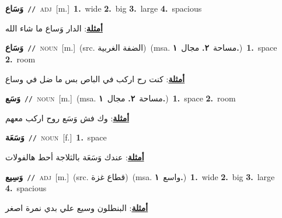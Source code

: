 \documentclass[10pt,a4paper,twoside]{article} %
\begin{document}
\begin{multicols}{2}
{\setlength\topsep{0pt}\textbf{\foreignlanguage{arabic}{وَسَاع}}\ {\color{gray}\texttt{//}\color{black}}\ \textsc{adj}\ [m.]\ \textbf{1.}~wide  \textbf{2.}~big  \textbf{3.}~large  \textbf{4.}~spacious\  \begin{flushright}\color{gray}\foreignlanguage{arabic}{\textbf{\underline{\foreignlanguage{arabic}{أمثلة}}}: الدار وَساع ما شاء الله}\end{flushright}\color{black}} \vspace{2mm}

{\setlength\topsep{0pt}\textbf{\foreignlanguage{arabic}{وَسَاع}}\ {\color{gray}\texttt{//}\color{black}}\ \textsc{noun}\ [m.]\ (src. \color{gray}\foreignlanguage{arabic}{الضفة الغربية}\color{black})\ \color{gray}(msa. \foreignlanguage{arabic}{مساحة}~\foreignlanguage{arabic}{\textbf{٢.}}  \foreignlanguage{arabic}{مجال}~\foreignlanguage{arabic}{\textbf{١.}})\color{black}\ \textbf{1.}~space  \textbf{2.}~room\  \begin{flushright}\color{gray}\foreignlanguage{arabic}{\textbf{\underline{\foreignlanguage{arabic}{أمثلة}}}: كنت رح اركب في الباص بس ما ضل في وساع}\end{flushright}\color{black}} \vspace{2mm}

{\setlength\topsep{0pt}\textbf{\foreignlanguage{arabic}{وَسَع}}\ {\color{gray}\texttt{//}\color{black}}\ \textsc{noun}\ [m.]\ \color{gray}(msa. \foreignlanguage{arabic}{مساحة}~\foreignlanguage{arabic}{\textbf{٢.}}  \foreignlanguage{arabic}{مجال}~\foreignlanguage{arabic}{\textbf{١.}})\color{black}\ \textbf{1.}~space  \textbf{2.}~room\  \begin{flushright}\color{gray}\foreignlanguage{arabic}{\textbf{\underline{\foreignlanguage{arabic}{أمثلة}}}: وك فش وَسَع روح اركب معهم}\end{flushright}\color{black}} \vspace{2mm}

{\setlength\topsep{0pt}\textbf{\foreignlanguage{arabic}{وَسَعَة}}\ {\color{gray}\texttt{//}\color{black}}\ \textsc{noun}\ [f.]\ \textbf{1.}~space\  \begin{flushright}\color{gray}\foreignlanguage{arabic}{\textbf{\underline{\foreignlanguage{arabic}{أمثلة}}}: عندك وَسَعَة بالثلاجة أحط هالفولات}\end{flushright}\color{black}} \vspace{2mm}

{\setlength\topsep{0pt}\textbf{\foreignlanguage{arabic}{وَسِيع}}\ {\color{gray}\texttt{//}\color{black}}\ \textsc{adj}\ [m.]\ (src. \color{gray}\foreignlanguage{arabic}{قطاع غزة}\color{black})\ \color{gray}(msa. \foreignlanguage{arabic}{واسع}~\foreignlanguage{arabic}{\textbf{١.}})\color{black}\ \textbf{1.}~wide  \textbf{2.}~big  \textbf{3.}~large  \textbf{4.}~spacious\  \begin{flushright}\color{gray}\foreignlanguage{arabic}{\textbf{\underline{\foreignlanguage{arabic}{أمثلة}}}: البنطلون وسيع علي بدي نمرة اصغر}\end{flushright}\color{black}} \vspace{2mm}


\end{multicols}
\end{document}
